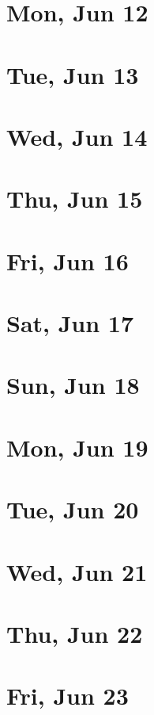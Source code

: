 	\section{Mon, Jun 12}
		
	\section{Tue, Jun 13}
		
	\section{Wed, Jun 14}
		
	\section{Thu, Jun 15}
		
	\section{Fri, Jun 16}
		
	\section{Sat, Jun 17}
		
	\section{Sun, Jun 18}
		
	\section{Mon, Jun 19}
		
	\section{Tue, Jun 20}
		
	\section{Wed, Jun 21}
		
	\section{Thu, Jun 22}
		
	\section{Fri, Jun 23}
		
